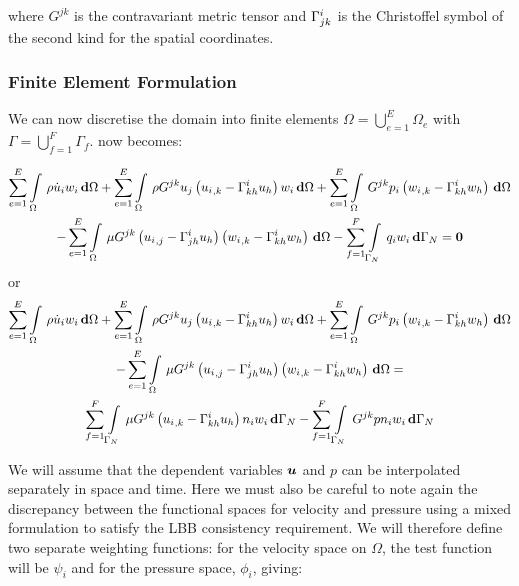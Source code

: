 where $G^{jk}$ is the contravariant metric tensor and $ \Gamma^{i}_{jk} $
is the Christoffel symbol of the second kind for the spatial coordinates.

\subsubsection{Finite Element Formulation}

We can now discretise the domain into finite elements \ie
$\Omega=\displaystyle{\bigcup_{e=1}^{E}}\Omega_{e}$ with
$\Gamma=\displaystyle{\bigcup_{f=1}^{F}}\Gamma_{f}$.  now
becomes:

\begin{multline}
  \dsum_{e=1}^{E}\gint{\Omega}{}{\rho\dot{u}_{i}w_{i}}{\Omega}
 +\dsum_{e=1}^{E}\gint{\Omega}{}{{\rho}G^{jk}{u_j}\pbrac{\partialderiv{u_{i}}{k}-\christoffel{i}{k}{h}u_h}{w_{i}}}{\Omega}
 +\dsum_{e=1}^{E}\gint{\Omega}{}{G^{jk}{p_{i}}\pbrac{\partialderiv{w_{i}}{k}-\christoffel{i}{k}{h}w_h}}{\Omega}\\
 -\dsum_{e=1}^{E}\gint{\Omega}{}{{\mu}G^{jk}\pbrac{\partialderiv{u_{i}}{j}-\christoffel{i}{j}{h}u_h}\pbrac{\partialderiv{w_{i}}{k}-\christoffel{i}{k}{h}w_h}}{\Omega}
 -\dsum_{f=1}^{F}\gint{\Gamma_N}{}{{q_{i}}{w_i}}{\Gamma_N}=\vectr{0}
 \label{eqn:FEMNSE}
\end{multline} 
or
\begin{multline}
  \dsum_{e=1}^{E}\gint{\Omega}{}{\rho\dot{u}_{i}w_{i}}{\Omega}
 +\dsum_{e=1}^{E}\gint{\Omega}{}{{\rho}G^{jk}{u_j}\pbrac{\partialderiv{u_{i}}{k}-\christoffel{i}{k}{h}u_h}{w_{i}}}{\Omega}
 +\dsum_{e=1}^{E}\gint{\Omega}{}{G^{jk}{p_{i}}\pbrac{\partialderiv{w_{i}}{k}-\christoffel{i}{k}{h}w_h}}{\Omega}\\
 -\dsum_{e=1}^{E}\gint{\Omega}{}{{\mu}G^{jk}\pbrac{\partialderiv{u_{i}}{j}-\christoffel{i}{j}{h}u_h}\pbrac{\partialderiv{w_{i}}{k}-\christoffel{i}{k}{h}w_h}}{\Omega}=\\
 \dsum_{f=1}^{F}\gint{\Gamma_N}{}{{\mu}G^{jk}\pbrac{\partialderiv{u_{i}}{k}-\christoffel{i}{k}{h}u_h}{n_{i}}{w_{i}}}{\Gamma_N}
 -\dsum_{f=1}^{F}\gint{\Gamma_N}{}{G^{jk}{p}{n_i}{w_i}}{\Gamma_N}
 \label{eqn:FEMNSE2}
\end{multline} 

We will assume that the dependent variables $\boldsymbol{u}$ and $p$ can be
interpolated separately in space and time. Here we must also be careful to
note again the discrepancy between the functional spaces for velocity and
pressure using a mixed formulation to satisfy the LBB consistency
requirement. We will therefore define two separate weighting functions: for
the velocity space on $\Omega$, the test function will be $\psi_{i}$ and for the
pressure space, $\phi_{i}$, giving:

